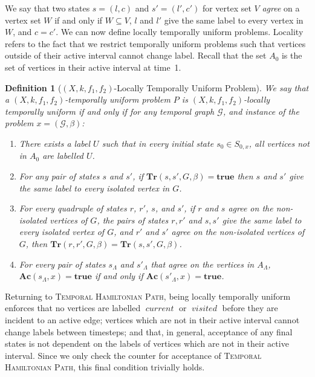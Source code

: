 \documentclass[a4paper,UKenglish,cleveref, autoref, thm-restate]{lipics-v2021} %
\DeclareMathOperator{\visited}{\textit{visited}}
\DeclareMathOperator{\current}{\textit{current}}
\newcounter{ctheorem}
\newtheorem{defn}[ctheorem]{Definition}
\begin{document}
We say that two states $s = (l, c)$ and $s' = (l', c')$ for vertex set $V$ \emph{agree} on a vertex set $W$ if and only if $W \subseteq V$, $l$ and $l'$ give the same label to every vertex in $W$, and $c = c'$.  We can now define locally temporally uniform problems. Locality refers to the fact that we restrict temporally uniform problems such that vertices outside of their active interval cannot change label. Recall that the set $A_0$ is the set of vertices in their active interval at time~1.

\begin{defn}[$(X,k,f_1,f_2)$-Locally Temporally Uniform Problem]\label{def:loctempunf}
    We say that a $(X,k,f_1,f_2)$-temporally uniform problem $P$ is $(X,k,f_1,f_2)$-locally temporally uniform if and only if for any temporal graph $\mathcal{G}$, and instance of the problem $x=(\mathcal{G},\beta)$:
    \begin{enumerate}
        \item There exists a label $U$ such that in every initial state $s_0 \in S_{0,x}$, all vertices not in $A_0$ are labelled $U$.
        \item For any pair of states $s$ and $s'$, if $\textbf{Tr}(s, s', G,\beta)=\textbf{true}$ then $s$ and $s'$ give the same label to every isolated vertex in $G$.
        \item For every quadruple of states $r$, $r'$, $s$, and $s'$, if $r$ and $s$ agree on the non-isolated vertices of $G$, the pairs of states $r,r'$ and $s,s'$ give the same label to every isolated vertex of $G$, and $r'$ and $s'$ agree on the non-isolated vertices of $G$, then $\textbf{Tr}(r, r', G,\beta) = \textbf{Tr}(s, s', G,\beta)$.
        \item For every pair of states $s_\Lambda$ and $s'_\Lambda$ that agree on the vertices in $A_\Lambda$, $\textbf{Ac}(s_\Lambda, x)=\textbf{true}$ if and only if $\textbf{Ac}(s'_\Lambda, x)=\textbf{true}$.
    \end{enumerate}
\end{defn}

Returning to \textsc{Temporal Hamiltonian Path}, being locally temporally uniform enforces that no vertices are labelled $\current$ or $\visited$ before they are incident to an active edge; vertices which are not in their active interval cannot change labels between timesteps; and that, in general, acceptance of any final states is not dependent on the labels of vertices which are not in their active interval. Since we only check the counter for acceptance of \textsc{Temporal Hamiltonian Path}, this final condition trivially holds.
\end{document}
